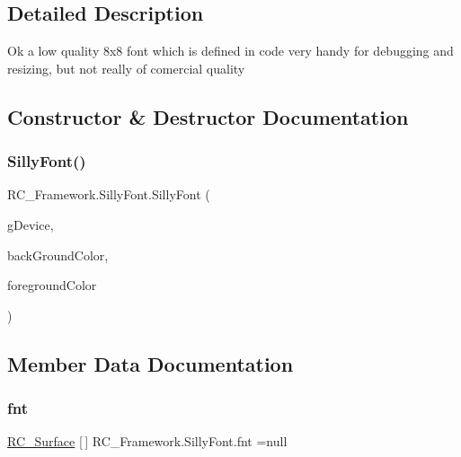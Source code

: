 \subsection{Detailed Description}
Ok a low quality 8x8 font which is defined in code very handy for debugging and resizing, but not really of comercial quality 



\subsection{Constructor \& Destructor Documentation}
\mbox{\label{class_r_c___framework_1_1_silly_font_a72496d4a4a8b21d77edcf2c1b50587cb}} 
\subsubsection{\texorpdfstring{Silly\+Font()}{SillyFont()}}
{\footnotesize\ttfamily R\+C\+\_\+\+Framework.\+Silly\+Font.\+Silly\+Font (\begin{DoxyParamCaption}\item[{Graphics\+Device}]{g\+Device,  }\item[{Color}]{back\+Ground\+Color,  }\item[{Color}]{foreground\+Color }\end{DoxyParamCaption})}



\subsection{Member Data Documentation}
\mbox{\label{class_r_c___framework_1_1_silly_font_a9537d47e675c0bc00bdd024666afeb9f}} 
\subsubsection{\texorpdfstring{fnt}{fnt}}
{\footnotesize\ttfamily \mbox{\hyperlink{class_r_c___framework_1_1_r_c___surface}{R\+C\+\_\+\+Surface}} \mbox{[}$\,$\mbox{]} R\+C\+\_\+\+Framework.\+Silly\+Font.\+fnt =null}

